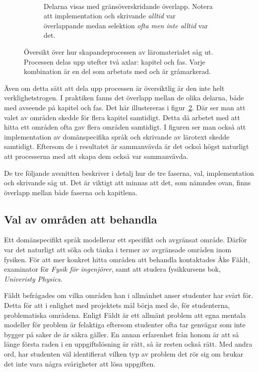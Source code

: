 \begin{draft}
\begin{figure}[tph]
\begin{subfigure}[t]{0.5\textwidth}
        \caption{Delarna visas med gränsöverskridande överlapp. Notera att
        implementation och skrivande \textit{alltid} var överlappande medan
      selektion \textit{ofta men inte alltid} var det.}~\label{fig:oversiktB}
    \end{subfigure}
    \caption{Översikt över hur skapandeprocessen av läromaterialet såg ut.
  Processen delas upp utefter två axlar: kapitel och fas. Varje kombination
  är en del som arbetats med och är gråmarkerad.} \end{figure}

Även om detta sätt att dela upp processen är översiktlig är den inte helt
verklighetstrogen. I praktiken fanns det överlapp mellan de olika delarna, både
med avseende på kapitel och fas. Det här illustereras i
figur~\ref{fig:oversiktB}. Där ser man att valet av områden skedde för flera
kapitel samtidigt. Detta då arbetet med att hitta ett områden ofta gav flera
områden samtidigt. I figuren ser man också att implementation av domänspecifika
språk och skrivande av lärotext skedde samtidigt. Eftersom de i resultatet är
sammanvävda är det också högst naturligt att processerna med att skapa dem
också var sammanvävda.

De tre följande avsnitten beskriver i detalj hur de tre faserna, val,
implementation och skrivande såg ut. Det är viktigt att minnas att det, som
nämndes ovan, finns överlapp mellan både faserna och kapitlena.

\subsection{Val av områden att behandla}\label{sec:selektion}

Ett domänspecifikt språk modellerar ett specifikt och avgränsat område. Därför
var det naturligt att söka och tänka i termer av avgränsade områden inom
fysiken. För att mer konkret hitta områden att behandla kontaktades Åke Fäldt,
examinator för \textit{Fysik för ingenjörer}, samt att studera fysikkursens
bok, \textit{Univeristy Physics}.

Fäldt befrågades om vilka områden han i allmänhet anser studenter har
svårt för. Detta för att i enlighet med projektets mål börja med de, för
studenterna, problematiska områdena. Enligt Fäldt är ett allmänt problem att
egna mentala modeller för problem är felaktiga eftersom studenter ofta tar
genvägar som inte bygger på saker de är säkra gäller. En annan erfarenhet
från honom är att så länge första raden i en uppgiftslösning är rätt, så är
resten också rätt. Med andra ord, har studenten väl identifierat vilken typ av
problem det rör sig om brukar det inte vara några svårigheter att lösa
uppgiften.


\end{draft}
